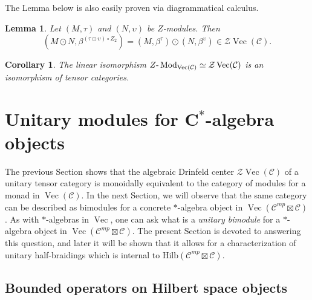 \documentclass[a4paper,11pt,reqno]{amsart}
\numberwithin{equation}{section}
\newtheorem{corollary}[theorem]{Corollary}
\newtheorem{lemma}[theorem]{Lemma}
\theoremstyle{remark}
\theoremstyle{definition}
\def\-{{\hbox{-}}}
\newcommand{\cC}{\mathcal C}
\newcommand{\cZ}{\mathcal Z}
\DeclareMathOperator{\Mod}{Mod}
\DeclareMathOperator{\Vect}{Vec}
\newcommand{\Hilb}{\mathrm{Hilb}}
\begin{document}
The Lemma below is also easily proven via diagrammatical calculus.

\begin{lemma}
	Let $(M,\tau)$ and $(N,\upsilon)$ be $Z$-modules. Then
	\[
	(M \odot N, \beta^{(\tau \odot \upsilon) \circ Z_2}) = (M,\beta^\tau) \odot (N,\beta^\upsilon) \in \cZ \Vect(\cC) .
	\]
\end{lemma}

\begin{corollary}
	The linear isomorphism $Z \- \Mod_{\Vect(\cC)} \simeq \cZ \Vect(\cC)$ is an isomorphism of tensor categories.
\end{corollary}

\section{Unitary modules for C$^*$-algebra objects}

The previous Section shows that the algebraic Drinfeld center $\cZ \Vect(\cC)$ of a unitary tensor category is monoidally equivalent to the category of modules for a monad in $\Vect(\cC)$. In the next Section, we will observe that the same category can be described as bimodules for a concrete $*$-algebra object in $\Vect(\cC^{mp} \boxtimes \cC)$. As with $*$-algebras in $\Vect$, one can ask what is a {\em unitary bimodule} for a $*$-algebra object in $\Vect(\cC^{mp} \boxtimes \cC)$. The present Section is devoted to answering this question, and later it will be shown that it allows for a characterization of unitary half-braidings which is internal to $\Hilb(\cC^{mp} \boxtimes \cC)$.

\subsection{Bounded operators on Hilbert space objects}
\end{document}
